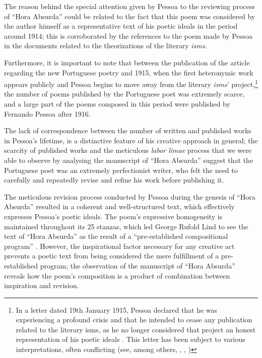 \begin{paper}
The reason behind the special attention given by Pessoa to the reviewing
process of ``Hora Absurda'' could be related to the fact that this poem
was considered by the author himself as a representative text of his
poetic ideals in the period around 1914; this is corroborated by the
references to the poem made by Pessoa in the documents related to the
theorizations of the literary \emph{isms}.

Furthermore, it is important to note that between the publication of the
article regarding the new Portuguese poetry \citep{pessoa_nova_1912} and 1915, when the
first heteronymic work appears publicly and Pessoa begins to move away
from the literary \emph{isms}' project,\footnote{In a letter dated 19th
  January 1915, Pessoa declared that he was experiencing a profound
  crisis and that he intended to cease any publication related to the
  literary isms, as he no longer considered that project an honest
  representation of his poetic ideals \citep[356]{pessoa_sensacionismo_2009}. This letter
  has been subject to various interpretations, often conflicting (see,
  among others, \cite{gagliardi_uma_2004}, \cite{amado_orpheu_2015}, \cite{miraglia_dia_2020})} the number
of poems published by the Portuguese poet was extremely scarce, and a
large part of the poems composed in this period were published by
Fernando Pessoa after 1916.

The lack of correspondence between the number of written and published
works in Pessoa's lifetime, is a distinctive feature of his creative
approach in general; the scarcity of published works and the meticulous
\emph{labor limae} process that we were able to observe by analysing the
manuscript of ``Hora Absurda'' suggest that the Portuguese poet was an
extremely perfectionist writer, who felt the need to carefully and
repeatedly revise and refine his work before publishing it.

The meticulous revision process conducted by Pessoa during the genesis
of ``Hora Absurda'' resulted in a coherent and well-structured text,
which effectively expresses Pessoa's poetic ideals. The poem's
expressive homogeneity is maintained throughout its 25 stanzas, which
led George Rufold Lind to see the text of ``Hora Absurda'' as the result
of a ``pre-established compositional program'' \citep[23]{lind_teoria_1970}. However, the
inspirational factor necessary for any creative act prevents a poetic
text from being considered the mere fulfillment of a pre-established
program; the observation of the manuscript of ``Hora Absurda'' reveals
how the poem's composition is a product of combination between
inspiration and revision.


\end{paper}
